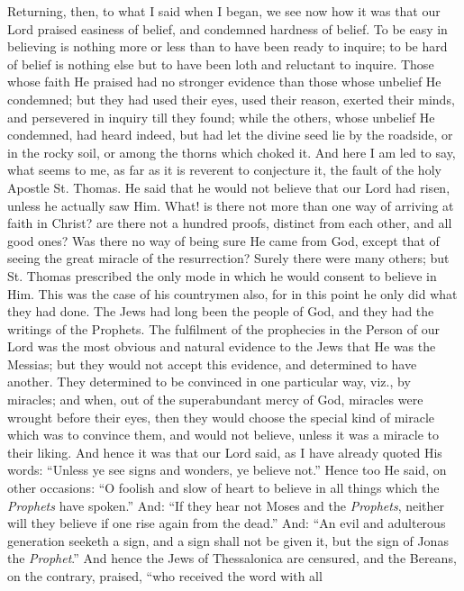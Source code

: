 Returning, then, to what I said when I began, we see
now how it was that our Lord praised easiness of belief,
and condemned hardness of belief. To be easy in believing
is nothing more or less than to have been ready to
inquire; to be hard of belief is nothing else but to have
been loth and reluctant to inquire. Those whose faith He
praised had no stronger evidence than those whose
unbelief He condemned; but they had used their eyes, used
their reason, exerted their minds, and persevered in
inquiry till they found; while the others, whose unbelief
He condemned, had heard indeed, but had let the divine
seed lie by the roadside, or in the rocky soil, or among
the thorns which choked it. And here I am led to say,
what seems to me, as far as it is reverent to conjecture
it, the fault of the holy Apostle St. Thomas. He said
that he would not believe that our Lord had risen, unless
he actually saw Him. What! is there not more than one way
of arriving at faith in Christ? are there not a hundred
proofs, distinct from each other, and all good ones? Was
there no way of being sure He came from God, except that
of seeing the great miracle of the resurrection? Surely
there were many others; but St. Thomas prescribed the
only mode in which he would consent to believe in Him.
This was the case of his countrymen also, for in this
point he only did what they had done. The Jews had long
been the people of God, and they had the writings of the
Prophets. The fulfilment of the prophecies in the Person
of our Lord was the most obvious and natural evidence to
the Jews that He was the Messias; but they would not
accept this evidence, and determined to have another.
They determined to be convinced in one particular way,
viz., by miracles; and when, out of the superabundant
mercy of God, miracles were wrought before their eyes,
then they would choose the special kind of miracle which
was to convince them, and would not believe, unless it
was a miracle to their liking. And hence it was that our
Lord said, as I have already quoted His words:
``Unless ye see signs and wonders, ye believe
not.'' Hence too He said, on other occasions: ``O
foolish and slow of heart to believe in all things which
the \emph{Prophets} have spoken.'' And: ``If they hear not Moses and the \emph{Prophets}, neither will they
believe if one rise again from the dead.'' And:
``An evil and adulterous generation seeketh a sign,
and a sign shall not be given it, but the sign of Jonas
the \emph{Prophet}.'' And hence the Jews of
Thessalonica are censured, and the Bereans, on the
contrary, praised, ``who received the word with all
